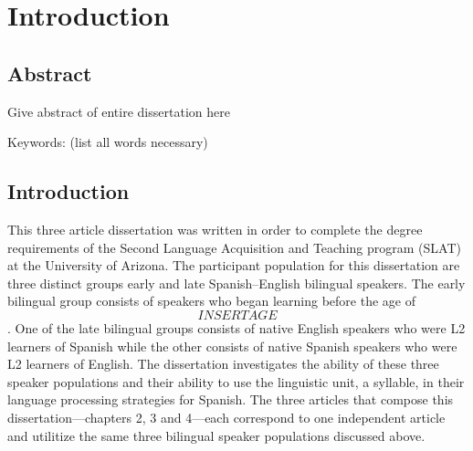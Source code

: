 
\chapter{Introduction} %

\label{Chapter1} %


\section{Abstract}

Give abstract of entire dissertation here

Keywords: (list all words necessary)


\section{Introduction}

This three article dissertation was written in order to complete the degree requirements of the Second Language Acquisition and Teaching program (SLAT) at the University of Arizona. The participant population for this dissertation are three distinct groups early and late Spanish–English bilingual speakers. The early bilingual group consists of speakers who began learning before the age of \[INSERT AGE\]. One of the late bilingual groups consists of native English speakers who were L2 learners of Spanish while the other consists of native Spanish speakers who were L2 learners of English. The dissertation investigates the ability of these three speaker populations and their ability to use the linguistic unit, a syllable, in their language processing strategies for Spanish. The three articles that compose this dissertation---chapters 2, 3 and 4---each correspond to one independent article and utilitize the same three bilingual speaker populations discussed above.

